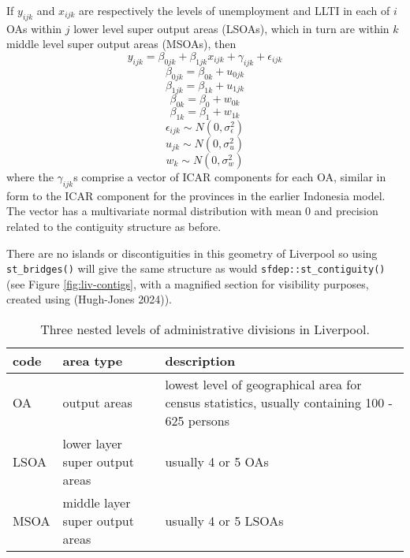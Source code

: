 If \(y_{ijk}\) and \(x_{ijk}\) are respectively the levels of unemployment and LLTI in each of \(i\) OAs within \(j\) lower level super output areas (LSOAs), which in turn are within \(k\) middle level super output areas (MSOAs), then
\begin{equation}
y_{ijk} = \beta_{0jk} + \beta_{1jk}x_{ijk} + \gamma_{ijk} + \epsilon_{ijk}
\label{eq:eq9}
\end{equation}
\begin{equation}
\beta_{0jk} = \beta_{0k} + u_{0jk}
\label{eq:eq10}
\end{equation}
\begin{equation}
\beta_{1jk} = \beta_{1k} + u_{1jk}
\label{eq:eq11}
\end{equation}
\begin{equation}
\beta_{0k} = \beta_0 + w_{0k}
\label{eq:eq12}
\end{equation}
\begin{equation}
\beta_{1k} = \beta_1 + w_{1k}
\label{eq:eq13}
\end{equation}
\begin{equation}
\epsilon_{ijk} \sim N(0,\sigma_{\epsilon}^2)
\label{eq:eq14}
\end{equation}
\begin{equation}
u_{jk} \sim N(0,\sigma_{u}^2)
\label{eq:eq15}
\end{equation}
\begin{equation}
 w_{k} \sim N(0,\sigma_{w}^2)
\label{eq:eq16}
\end{equation}
where the \(\gamma_{ijk}\)s comprise a vector of ICAR components for each OA, similar in form to the ICAR component for the provinces in the earlier Indonesia model. The vector has a multivariate normal distribution with mean 0 and precision related to the contiguity structure as before.

There are no islands or discontiguities in this geometry of Liverpool so using \texttt{st\_bridges()} will give the same structure as would \texttt{sfdep::st\_contiguity()} (see Figure \ref{fig:liv-contigs}, with a magnified section for visibility purposes, created using  (Hugh-Jones 2024)).

\begin{table}

\caption{\label{tab:livadmin-latex}Three nested levels of administrative divisions in Liverpool.}
\centering
\fontsize{8}{10}\selectfont
\begin{tabular}[t]{l|l|>{\raggedright\arraybackslash}p{7cm}}
\hline
\textbf{code} & \textbf{area type} & \textbf{description}\\
\hline
OA & output areas & lowest level of geographical area for census statistics, usually containing 100 - 625 persons\\
\hline
LSOA & lower layer super output areas & usually 4 or 5 OAs\\
\hline
MSOA & middle layer super output areas & usually 4 or 5 LSOAs\\
\hline
\end{tabular}
\end{table}

